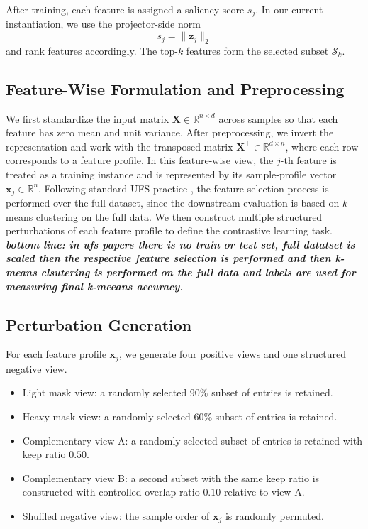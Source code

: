 \documentclass[sigconf,natbib=true,anonymous=true]{acmart}
\begin{document}
After training, each feature is assigned a saliency score $s_j$. In our current
instantiation, we use the projector-side norm
\[
s_j = \|\mathbf{z}_j\|_2
\]
and rank features accordingly. The top-$k$ features form the selected subset
$\mathcal{S}_k$.




\subsection{Feature-Wise Formulation and Preprocessing}
We first standardize the input matrix $\mathbf{X} \in \mathbb{R}^{n \times d}$
across samples so that each feature has zero mean and unit variance. After
preprocessing, we invert the representation and work with the transposed matrix
$\mathbf{X}^{\top} \in \mathbb{R}^{d \times n}$, where each row corresponds to a
feature profile. In this feature-wise view, the $j$-th feature is treated as a
training instance and is represented by its sample-profile vector
$\mathbf{x}_j \in \mathbb{R}^{n}$. Following standard UFS practice
\cite{shaham2022deep}, the feature selection process is performed over the full
dataset, since the downstream evaluation is based on $k$-means clustering on
the full data. We then construct multiple structured perturbations of each
feature profile to define the contrastive learning task.\textbf{\textit{ bottom line: in ufs papers there is no train or test set, full datatset is scaled then the respective feature selection is performed and then k-means clsutering is performed on the full data and labels are used for measuring final k-meeans accuracy.  }}

\subsection{Perturbation Generation}
For each feature profile $\mathbf{x}_j$, we generate four positive views and one
structured negative view.

\begin{itemize}
\item Light mask view: a randomly selected $90\%$ subset of entries is retained.
\item Heavy mask view: a randomly selected $60\%$ subset of entries is retained.
\item Complementary view A: a randomly selected subset of entries is retained with keep ratio $0.50$.
\item Complementary view B: a second subset with the same keep ratio is constructed with controlled overlap ratio $0.10$ relative to view A.
\item Shuffled negative view: the sample order of $\mathbf{x}_j$ is randomly permuted.
\end{itemize}
\end{document}
